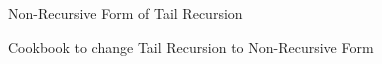 \begin{frame}{Non-Recursive Form of Tail Recursion}
\begin{block}{Cookbook to change Tail Recursion to Non-Recursive Form}
\begin{itemize}
{\begin{columns}
    \begin{column}{.001\linewidth}~\end{column}
  \end{columns}
}

  \end{itemize}
  \end{block}
\end{frame}
